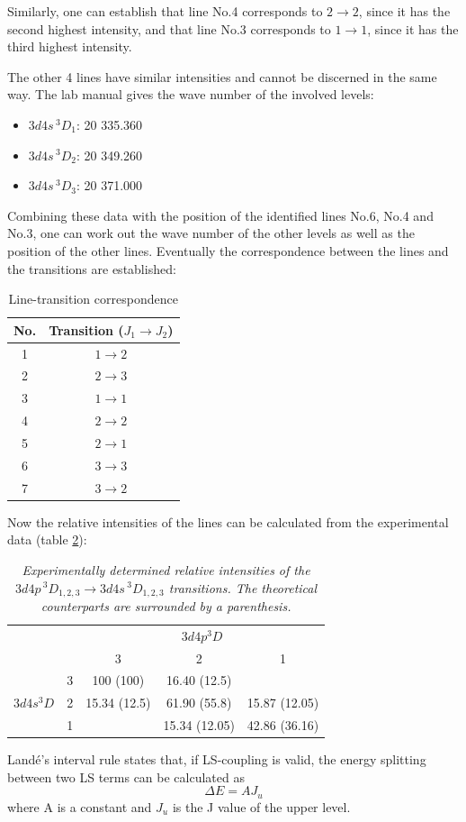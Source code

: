 \documentclass[a4paper]{article}
\begin{document}
Similarly, one can establish that line No.4 corresponds to $2 \to 2$,
since it has the second highest intensity, and that line No.3
corresponds to $1 \to 1$, since it has the third highest intensity.

The other 4 lines have similar intensities and cannot be discerned in
the same way. The lab manual gives the wave number of the involved
levels:
\begin{itemize}
\item $3d4s\,^3D_1$: 20 335.360
\item $3d4s\,^3D_2$: 20 349.260
\item $3d4s\,^3D_3$: 20 371.000
\end{itemize}
Combining these data with the position of the identified lines No.6,
No.4 and No.3, one can work out the wave number of the other levels as
well as the position of the other lines. Eventually the correspondence
between the lines and the transitions are established:
\begin{table}[htb!]
\centering
\begin{tabular}{c|c}
\hline
No. & Transition ($J_1 \to J_2$)\\
\hline
1 & $1 \to 2$ \\
2 & $2 \to 3$ \\
3 & $1 \to 1$ \\
4 & $2 \to 2$\\
5 & $2 \to 1$\\
6 & $3 \to 3$\\
7 & $3 \to 2$\\
\hline
\end{tabular}
\caption{Line-transition correspondence}
\label{tab:line-transition1}
\end{table}
Now the relative intensities of the lines can be calculated from the
experimental data (table \ref{tab:exp-intensity1}):
\begin{table}[htb!]
\centering
\begin{tabular}{cc|c|c|c|}
\cline{3-5}
& & \multicolumn{3}{c|}{$3d4p ^3D$}\\
\cline{3-5}
& & 3 & 2 & 1\\
\hline
\multicolumn{1}{|c|}{\multirow{3}{*}{$3d4s ^3D$}} & 3 & 100 (100) &
16.40 (12.5) & \\
\multicolumn{1}{|c|}{} & 2 & 15.34 (12.5) & 61.90 (55.8) & 15.87 (12.05) \\
\multicolumn{1}{|c|}{} & 1 & & 15.34 (12.05) & 42.86 (36.16) \\
\hline
\end{tabular}
\caption{\it Experimentally determined relative intensities of the
  $3d4p\,^3D_{1,2,3} \to 3d4s\,^3D_{1,2,3}$ transitions. The
  theoretical counterparts are surrounded by a parenthesis.}
\label{tab:exp-intensity1}
\end{table}
Land\'e's interval rule states that, if LS-coupling is valid, the
energy splitting between two LS terms can be calculated as
\[
\Delta E = A J_u
\]
where A is a constant and $J_u$ is the J value of the upper level.
\end{document}
